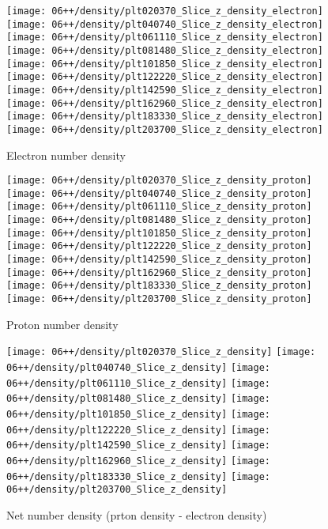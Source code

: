 \begin{figure}
  \centering
  {\texttt{[image: 06++/density/plt020370\_Slice\_z\_density\_electron]}}
  {\texttt{[image: 06++/density/plt040740\_Slice\_z\_density\_electron]}}
  {\texttt{[image: 06++/density/plt061110\_Slice\_z\_density\_electron]}}
  {\texttt{[image: 06++/density/plt081480\_Slice\_z\_density\_electron]}}
  {\texttt{[image: 06++/density/plt101850\_Slice\_z\_density\_electron]}}
  {\texttt{[image: 06++/density/plt122220\_Slice\_z\_density\_electron]}}
  {\texttt{[image: 06++/density/plt142590\_Slice\_z\_density\_electron]}}
  {\texttt{[image: 06++/density/plt162960\_Slice\_z\_density\_electron]}}
  {\texttt{[image: 06++/density/plt183330\_Slice\_z\_density\_electron]}}
  {\texttt{[image: 06++/density/plt203700\_Slice\_z\_density\_electron]}}
  \caption{Electron number density}\label{fig:06++_e}
\end{figure}

\begin{figure}
  \centering
    {\texttt{[image: 06++/density/plt020370\_Slice\_z\_density\_proton]}}
    {\texttt{[image: 06++/density/plt040740\_Slice\_z\_density\_proton]}}
    {\texttt{[image: 06++/density/plt061110\_Slice\_z\_density\_proton]}}
    {\texttt{[image: 06++/density/plt081480\_Slice\_z\_density\_proton]}}
    {\texttt{[image: 06++/density/plt101850\_Slice\_z\_density\_proton]}}
    {\texttt{[image: 06++/density/plt122220\_Slice\_z\_density\_proton]}}
    {\texttt{[image: 06++/density/plt142590\_Slice\_z\_density\_proton]}}
    {\texttt{[image: 06++/density/plt162960\_Slice\_z\_density\_proton]}}
    {\texttt{[image: 06++/density/plt183330\_Slice\_z\_density\_proton]}}
    {\texttt{[image: 06++/density/plt203700\_Slice\_z\_density\_proton]}}
  \caption{Proton number density}\label{fig:06++_p}
\end{figure}

\begin{figure}
  \centering
  {\texttt{[image: 06++/density/plt020370\_Slice\_z\_density]}}
  {\texttt{[image: 06++/density/plt040740\_Slice\_z\_density]}}
  {\texttt{[image: 06++/density/plt061110\_Slice\_z\_density]}}
  {\texttt{[image: 06++/density/plt081480\_Slice\_z\_density]}}
  {\texttt{[image: 06++/density/plt101850\_Slice\_z\_density]}}
  {\texttt{[image: 06++/density/plt122220\_Slice\_z\_density]}}
  {\texttt{[image: 06++/density/plt142590\_Slice\_z\_density]}}
  {\texttt{[image: 06++/density/plt162960\_Slice\_z\_density]}}
  {\texttt{[image: 06++/density/plt183330\_Slice\_z\_density]}}
  {\texttt{[image: 06++/density/plt203700\_Slice\_z\_density]}}
  \caption{Net number density (prton density - electron density)}\label{fig:06++_density}
\end{figure}

